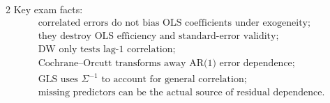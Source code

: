 \documentclass[9pt,a4paper]{extarticle}
\begin{document}
\begin{multicols}{2}
Key exam facts:
\[
\boxed{
\begin{array}{l}
\text{correlated errors do not bias OLS coefficients under exogeneity;}\\
\text{they destroy OLS efficiency and standard-error validity;}\\
\text{DW only tests lag-1 correlation;}\\
\text{Cochrane--Orcutt transforms away AR(1) error dependence;}\\
\text{GLS uses }\Sigma^{-1}\text{ to account for general correlation;}\\
\text{missing predictors can be the actual source of residual dependence.}
\end{array}}
\]

\end{multicols}
\end{document}
